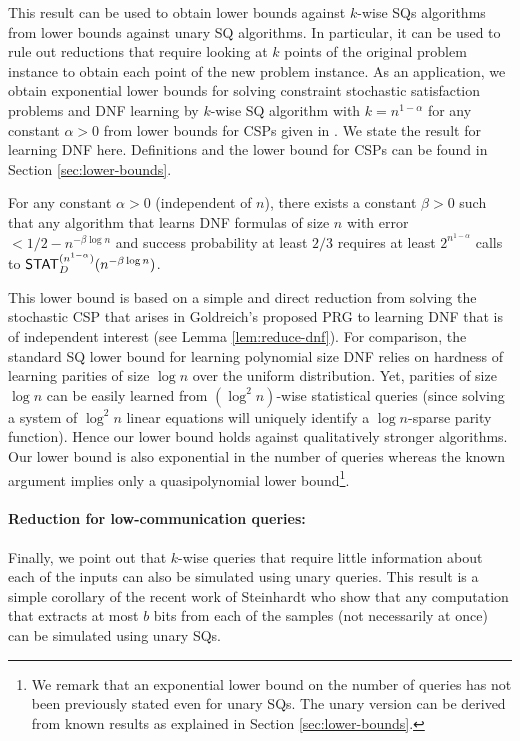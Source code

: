 This result can be used to obtain lower bounds against $k$-wise SQs algorithms from lower bounds against unary SQ algorithms. In particular, it can be used to rule out reductions that require looking at $k$ points of the original problem instance to obtain each point of the new problem instance. As an application, we obtain exponential lower bounds for solving constraint stochastic satisfaction problems and DNF learning by $k$-wise SQ algorithm with $k=n^{1-\alpha}$ for any constant $\alpha > 0$ from lower bounds for CSPs given in \cite{FeldmanPV:13}.
We state the result for learning DNF here. Definitions and the lower bound for CSPs can be found in Section \ref{sec:lower-bounds}.
\begin{theorem}\label{thm:dnf-k-wise-intro}
For any constant $\alpha >0$ (independent of $n$), there exists a constant $\beta>0$ such that
 any  algorithm that learns DNF formulas of size $n$ with error $<1/2 - n^{- \beta \log n}$ and success probability at least $2/3$ requires at least $2^{n^{1-\alpha}}$ calls to $\mathsf{STAT}^{(n^{1-\alpha})}_D(n^{- \beta \log n})$.
\end{theorem}
This lower bound is based on a simple and direct reduction from solving the stochastic CSP that arises in Goldreich's proposed PRG \cite{goldreich2000candidate} to learning DNF that is of independent interest (see Lemma \ref{lem:reduce-dnf}). For comparison, the standard SQ lower bound for learning polynomial size DNF \cite{BlumFJ+:94} relies on hardness of learning parities of size $\log n$ over the uniform distribution. Yet, parities of size $\log n$ can be easily learned from $(\log^2 n)$-wise statistical queries (since solving a system of $\log^2 n$ linear equations will uniquely identify a $\log n$-sparse parity function). Hence our lower bound holds against qualitatively stronger algorithms.  Our lower bound is also exponential in the number of queries whereas the known argument implies only a quasipolynomial lower bound\footnote{We remark that an exponential lower bound on the number of queries has not been previously stated even for unary SQs. The unary version can be derived from known results as explained in Section \ref{sec:lower-bounds}.}.

\paragraph{Reduction for low-communication queries:}
Finally, we point out that $k$-wise queries that require little information about each of the inputs can also be simulated using unary queries. This result is a simple corollary of the recent work of Steinhardt \etal \cite{SteinhardtVW16} who show that any computation that extracts at most $b$ bits from each of the samples (not necessarily at once) can be simulated using unary SQs.

